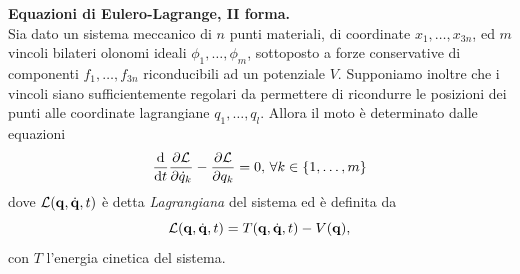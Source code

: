     \begin{theorem}
    \textbf{Equazioni di Eulero-Lagrange, II forma.}\\
    Sia dato un sistema meccanico di $n$ punti materiali, di coordinate $x_1, \dots, x_{3n}$, ed $m$ vincoli bilateri olonomi ideali $\phi_1,\dots,\phi_m$, sottoposto a forze conservative di componenti $f_1,\dots,f_{3n}$ riconducibili ad un potenziale $V$. Supponiamo inoltre che i vincoli siano sufficientemente regolari da permettere di ricondurre le posizioni dei punti alle coordinate lagrangiane $q_1,\dots,q_l$. Allora il moto è determinato dalle equazioni
    \begin{equation}
        \frac{\mathrm{d}}{\mathrm{d}t} \frac{\partial \mathcal{L}}{\partial \dot{q}_k} - \frac{\partial \mathcal{L}}{\partial q_k} = 0,\, \forall k \in \{1,\dots,m\}
    \end{equation}
    dove $\mathcal{L}(\mathbf{q},\dot{\mathbf{q}},t)$ è detta \emph{Lagrangiana} del sistema ed è definita da
    \begin{equation}
        \mathcal{L}(\mathbf{q},\dot{\mathbf{q}},t) = T(\mathbf{q},\dot{\mathbf{q}},t)-V(\mathbf{q}),
    \end{equation}
    con $T$ l'energia cinetica del sistema.
    \end{theorem}
